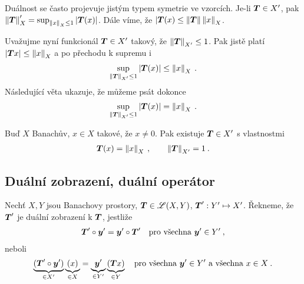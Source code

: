 Duálnost se často projevuje jistým typem symetrie ve vzorcích. Je-li $\boldsymbol{T} \in X'$, pak $\left\lVert\boldsymbol{T}\right\rVert_X' = \sup_{\left\lVert x\right\rVert_X \leq 1} |\boldsymbol{T}(x)|$. Dále víme, že $|\boldsymbol{T}(x) \leq \left\lVert\boldsymbol{T}\right\rVert \left\lVert x\right\rVert_X$. 

Uvažujme nyní funkcionál $\boldsymbol{T} \in X'$ takový, že $\left\lVert\boldsymbol{T}\right\rVert_{X'} \leq 1$. Pak jistě platí $|\boldsymbol{T} x| \leq \left\lVert x\right\rVert_X$ a po přechodu k supremu i \begin{align*}
    \sup_{\left\lVert\boldsymbol{T}\right\rVert_{X'} \leq 1} |\boldsymbol{T}(x)| \leq \left\lVert x\right\rVert_X \:.
\end{align*}
Následující věta ukazuje, že můžeme psát dokonce \begin{align*}
    \sup_{\left\lVert\boldsymbol{T}\right\rVert_{X'} \leq 1} |\boldsymbol{T}(x)| = \left\lVert x\right\rVert_X \:.
\end{align*}

\begin{theorem}
Buď $X$ Banachův, $x \in X$ takové, že $x \neq 0$. Pak existuje $\boldsymbol{T} \in X'$ s vlastnostmi \begin{align*}
    \boldsymbol{T}(x) = \left\lVert x\right\rVert_X \:, \qquad \left\lVert\boldsymbol{T}\right\rVert_{X'} = 1 \:.
\end{align*}
\end{theorem}

\subsection{Duální zobrazení, duální operátor}

\begin{definition}
Nechť $X,Y$ jsou Banachovy prostory, $\boldsymbol{T} \in \mathscr{L} (X,Y)$, $\boldsymbol{T}' : Y' \mapsto X'$. Řekneme, že $\boldsymbol{T}'$ je duální zobrazení k $\boldsymbol{T}$, jestliže \begin{align*}
    \boldsymbol{T}' \circ \boldsymbol{y}' = \boldsymbol{y}' \circ \boldsymbol{T}' \quad \text{pro všechna } \boldsymbol{y}' \in Y' \:,
\end{align*}
neboli \begin{align*}
    \underbrace{(\boldsymbol{T}' \circ \boldsymbol{y}')}_{\in X'} \underbrace{(x)}_{\in X} = \underbrace{\boldsymbol{y}'}_{\in Y'} \underbrace{(\boldsymbol{T} x)}_{\in Y} \quad \text{pro všechna } \boldsymbol{y}' \in Y' \text{ a všechna } x \in X \:.
\end{align*}
\end{definition}

